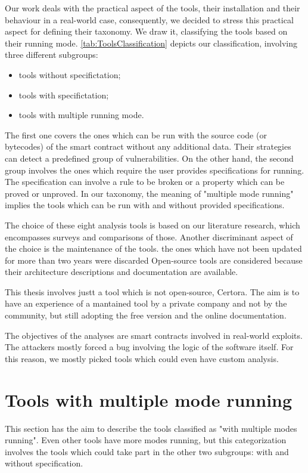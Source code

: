 Our work deals with the practical aspect of the tools, their installation and their behaviour in a real-world case, consequently, 
we decided to stress this practical aspect for defining their taxonomy.
We draw it, classifying the tools based on their running mode. \autoref{tab:ToolsClassification} depicts our classification, involving three different subgroups:
\begin{itemize}
    \item tools without specifictation;
    \item tools with specifictation;
    \item tools with multiple running mode.
\end{itemize}
The first one covers the ones which can be run with the source code (or bytecodes) of the smart contract without any additional data. Their strategies can detect a predefined group of vulnerabilities. 
On the other hand, the second group involves the ones which require the user provides specifications for running. The specification can involve a rule to be broken or a property which can be proved or unproved. 
In our taxonomy, the meaning of "multiple mode running" implies the tools which can be run with and without provided specifications. 

The choice of these eight analysis tools is based on our literature research, which encompasses surveys and comparisons of those. 
Another discriminant aspect of the choice is the maintenance of the tools. 
the ones which have not been updated for more than two years were discarded 
Open-source tools are considered because their architecture descriptions and documentation are available. 

This thesis involves justt a tool which is not open-source, Certora. 
The aim is to have an experience of a mantained tool by a private company and not by the community, but still adopting the free version and the online documentation.

The objectives of the analyses are smart contracts involved in real-world exploits. 
The attackers mostly forced a bug involving the logic of the software itself.
For this reason, we mostly picked tools which could even have custom analysis.

\section{Tools with multiple mode running}
This section has the aim to describe the tools classified as "with multiple modes running". 
Even other tools have more modes running, but this categorization involves the tools which could take part in the other two subgroups: 
with and without specification.

